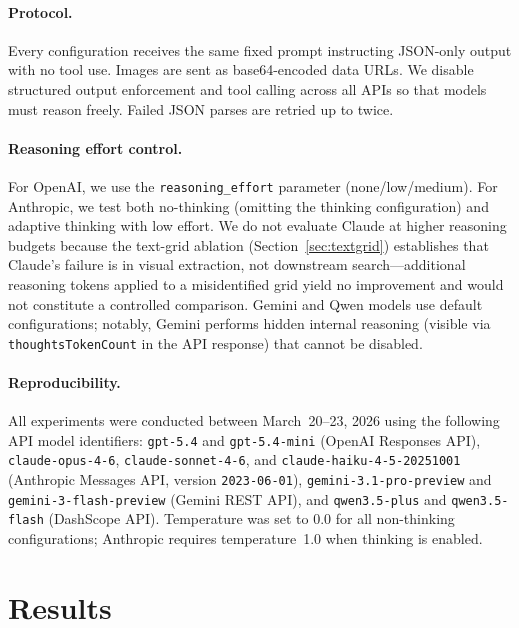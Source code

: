 \documentclass[11pt]{article}
\begin{document}
\paragraph{Protocol.}
Every configuration receives the same fixed prompt instructing JSON-only output with no tool use.
Images are sent as base64-encoded data URLs.
We disable structured output enforcement and tool calling across all APIs so that models must reason freely.
Failed JSON parses are retried up to twice.

\paragraph{Reasoning effort control.}
For OpenAI, we use the \texttt{reasoning\_effort} parameter (none/low/medium).
For Anthropic, we test both no-thinking (omitting the thinking configuration) and adaptive thinking with low effort.
We do not evaluate Claude at higher reasoning budgets because the text-grid ablation (Section~\ref{sec:textgrid}) establishes that Claude's failure is in visual extraction, not downstream search---additional reasoning tokens applied to a misidentified grid yield no improvement and would not constitute a controlled comparison.
Gemini and Qwen models use default configurations; notably, Gemini performs hidden internal reasoning (visible via \texttt{thoughtsTokenCount} in the API response) that cannot be disabled.

\paragraph{Reproducibility.}
All experiments were conducted between March~20--23, 2026 using the following API model identifiers: \texttt{gpt-5.4} and \texttt{gpt-5.4-mini} (OpenAI Responses API), \texttt{claude-opus-4-6}, \texttt{claude-sonnet-4-6}, and \texttt{claude-haiku-4-5-20251001} (Anthropic Messages API, version \texttt{2023-06-01}), \texttt{gemini-3.1-pro-preview} and \texttt{gemini-3-flash-preview} (Gemini REST API), and \texttt{qwen3.5-plus} and \texttt{qwen3.5-flash} (DashScope API).
Temperature was set to 0.0 for all non-thinking configurations; Anthropic requires temperature~1.0 when thinking is enabled.


\section{Results}
\label{sec:results}
\end{document}
